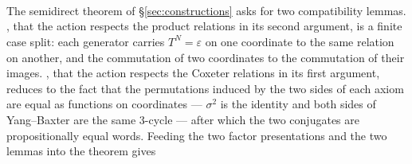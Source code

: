 \begin{code}
\AgdaSymbol{(}\AgdaSpace{}%
\AgdaSpace{}%
\AgdaSymbol{)}\<%
\\
%
\\[\AgdaEmptyExtraSkip]%
\>[0]\AgdaSpace{}%
\AgdaSymbol{:}\AgdaSpace{}%
\AgdaSpace{}%
\AgdaSymbol{\{}\AgdaSymbol{\}}\AgdaSpace{}%
\AgdaSpace{}%
\AgdaSpace{}%
\AgdaSpace{}%
\AgdaSpace{}%
\AgdaSpace{}%
\AgdaSpace{}%
\AgdaSpace{}%
\AgdaSpace{}%
\AgdaSpace{}%
\AgdaSymbol{(}\AgdaSpace{}%
\AgdaSpace{}%
\AgdaSymbol{)}\<%
\\
\>[0]\AgdaSpace{}%
\AgdaSpace{}%
\AgdaSpace{}%
\AgdaSymbol{=}\AgdaSpace{}%
\AgdaOperator{\AgdaInductiveConstructor{[}}\AgdaSpace{}%
\AgdaSpace{}%
\AgdaSpace{}%
\AgdaSpace{}%
\AgdaOperator{\AgdaInductiveConstructor{]ʷ}}\<%
\end{code}

\noindent The semidirect theorem of \S\ref{sec:constructions} asks for
two compatibility lemmas.  , that the action respects
the product relations in its second argument, is a finite case split:
each generator carries $T^{N} = \varepsilon$ on one coordinate to the
same relation on another, and the commutation of two coordinates to the
commutation of their images.  , that the action respects
the Coxeter relations in its first argument, reduces to the fact that
the permutations induced by the two sides of each axiom are equal as
functions on coordinates --- $\sigma^2$ is the identity and both sides
of Yang--Baxter are the same 3-cycle --- after which the two conjugates
are propositionally equal words.  Feeding the two factor presentations
and the two lemmas into the theorem gives

